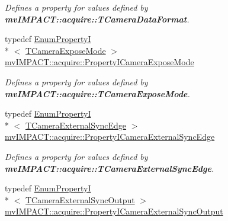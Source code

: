 \begin{DoxyCompactItemize}
\begin{DoxyCompactList}\small\item\em Defines a property for values defined by {\bfseries mv\+I\+M\+P\+A\+C\+T\+::acquire\+::\+T\+Camera\+Data\+Format}. \end{DoxyCompactList}\item 
\hypertarget{group___device_specific_interface_ga1b37c202f78d874f5a68bfd7555ea552}{typedef \hyperlink{classmv_i_m_p_a_c_t_1_1acquire_1_1_enum_property_i}{Enum\+Property\+I}\\*
$<$ \hyperlink{group___device_specific_interface_ga40926eaa36a3af4b5d380723be4024b9}{T\+Camera\+Expose\+Mode} $>$ \hyperlink{group___device_specific_interface_ga1b37c202f78d874f5a68bfd7555ea552}{mv\+I\+M\+P\+A\+C\+T\+::acquire\+::\+Property\+I\+Camera\+Expose\+Mode}}\label{group___device_specific_interface_ga1b37c202f78d874f5a68bfd7555ea552}

\begin{DoxyCompactList}\small\item\em Defines a property for values defined by {\bfseries mv\+I\+M\+P\+A\+C\+T\+::acquire\+::\+T\+Camera\+Expose\+Mode}. \end{DoxyCompactList}\item 
\hypertarget{group___device_specific_interface_gaac63793b596b074fc5012dd82aafd035}{typedef \hyperlink{classmv_i_m_p_a_c_t_1_1acquire_1_1_enum_property_i}{Enum\+Property\+I}\\*
$<$ \hyperlink{group___device_specific_interface_gaac8409db4152f0241d58b6b88a837fbd}{T\+Camera\+External\+Sync\+Edge} $>$ \hyperlink{group___device_specific_interface_gaac63793b596b074fc5012dd82aafd035}{mv\+I\+M\+P\+A\+C\+T\+::acquire\+::\+Property\+I\+Camera\+External\+Sync\+Edge}}\label{group___device_specific_interface_gaac63793b596b074fc5012dd82aafd035}

\begin{DoxyCompactList}\small\item\em Defines a property for values defined by {\bfseries mv\+I\+M\+P\+A\+C\+T\+::acquire\+::\+T\+Camera\+External\+Sync\+Edge}. \end{DoxyCompactList}\item 
\hypertarget{group___device_specific_interface_gaf4592fe544c7f9ad2d0b480f7f1b75b5}{typedef \hyperlink{classmv_i_m_p_a_c_t_1_1acquire_1_1_enum_property_i}{Enum\+Property\+I}\\*
$<$ \hyperlink{group___device_specific_interface_ga7e0cda0b45b6d0142d2560d276672edd}{T\+Camera\+External\+Sync\+Output} $>$ \hyperlink{group___device_specific_interface_gaf4592fe544c7f9ad2d0b480f7f1b75b5}{mv\+I\+M\+P\+A\+C\+T\+::acquire\+::\+Property\+I\+Camera\+External\+Sync\+Output}}\label{group___device_specific_interface_gaf4592fe544c7f9ad2d0b480f7f1b75b5}


\end{DoxyCompactItemize}
